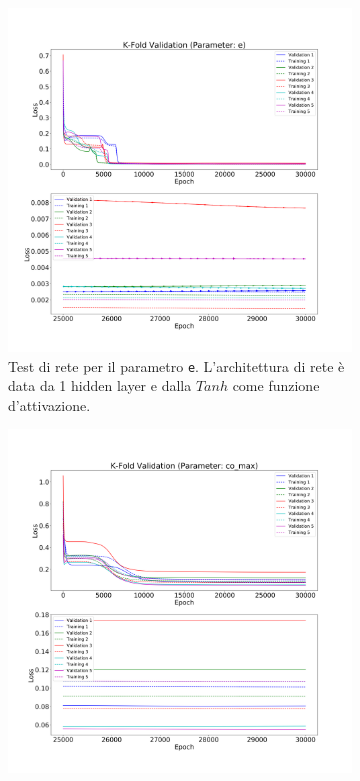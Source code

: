 \documentclass[12pt,a4paper,final]{book}
\begin{document}
\begin{figure}[!ht]
\centering
	\begin{subfigure}{0.49\textwidth}
	    \centering
	    \includegraphics[width=\linewidth]{../figures/Test_1L_Tanh_e.png}
	    \caption{Test di rete per il parametro \texttt{e}. L'architettura di rete è data da 1 hidden layer e dalla $Tanh$ come funzione d'attivazione.}
	    \label{test1}
	\end{subfigure}
	\begin{subfigure}{0.49\textwidth}
		\centering
	    \includegraphics[width=\linewidth]{../figures/Test_1L_Sigmoid_co_max.png}

\end{subfigure}
\end{figure}
\end{document}
